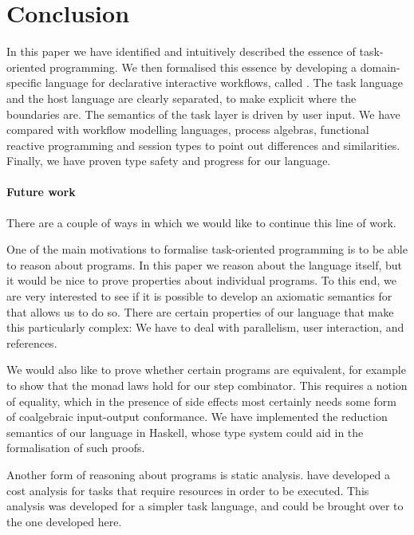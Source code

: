 
\section{Conclusion}

\label{sec:conclusions}

In this paper we have identified and intuitively described the essence of task-oriented programming.
We then formalised this essence by developing a domain-specific language for declarative interactive workflows, called \TOPHAT.
The task language and the host language are clearly separated, to make explicit where the boundaries are.
The semantics of the task layer is driven by user input.
We have compared \TOPHAT with workflow modelling languages, process algebras, functional reactive programming and session types to point out differences and similarities.
Finally, we have proven type safety and progress for our language.

\paragraph{Future work}

There are a couple of ways in which we would like to continue this line of work.

One of the main motivations to formalise task-oriented programming is to be able to reason about programs.
In this paper we reason about the language itself, but it would be nice to prove properties about individual programs.
To this end, we are very interested to see if it is possible to develop an axiomatic semantics for \TOPHAT that allows us to do so.
There are certain properties of our language that make this particularly complex:
We have to deal with parallelism, user interaction, and references.

We would also like to prove whether certain programs are equivalent, for example to show that the monad laws hold for our step combinator.
This requires a notion of equality, which in the presence of side effects most certainly needs some form of coalgebraic input-output conformance.
We have implemented the reduction semantics of our language in Haskell, whose type system could aid in the formalisation of such proofs.

Another form of reasoning about programs is static analysis.
\citet{conf/ifl/KlinikJP17} have developed a cost analysis for tasks that require resources in order to be executed.
This analysis was developed for a simpler task language, and could be brought over to the one developed here.


